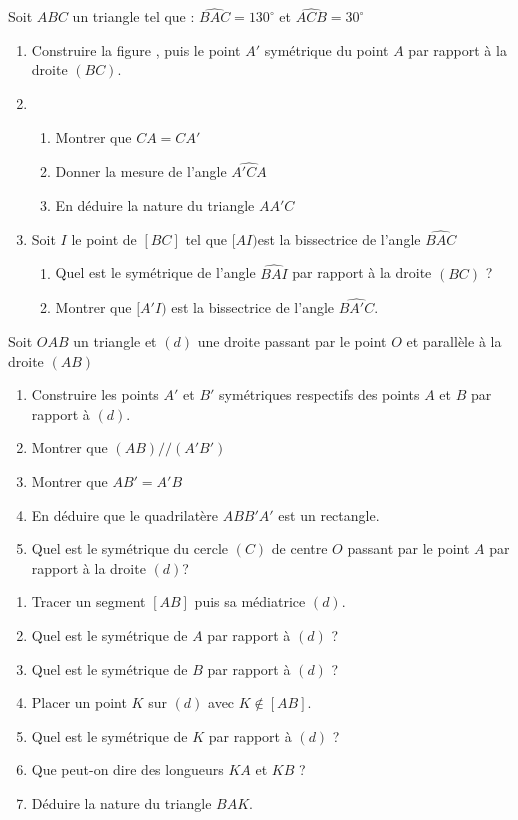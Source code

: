 \documentclass[a4paper,12pt]{article}
\begin{document}
\begin{exo}
Soit $ABC$ un triangle tel que : $\widehat{BAC}=130^{\circ}$ et $\widehat{ACB}=30^{\circ}$
\begin{enumerate}
\item Construire la figure , puis le point $A'$ symétrique du point $A$ par rapport à la droite $(BC)$.
\item
	\begin{enumerate}
	\item Montrer que $CA=CA'$
	\item Donner la mesure de l'angle $\widehat{A'CA}$
	\item En déduire la nature du triangle $AA'C$
	\end{enumerate}
\item Soit $I$ le point de $[BC]$ tel que $[AI)$est  la bissectrice de l'angle $\widehat{BAC}$
		\begin{enumerate}
		\item Quel est le symétrique de l'angle $\widehat{BAI}$ par rapport à la droite $(BC)$ ?
		\item Montrer que $[A'I)$ est la bissectrice de l'angle $\widehat{BA'C}$.
		\end{enumerate}	
\end{enumerate}
\end{exo}

\begin{exo}
Soit $OAB$ un triangle et $(d)$ une droite passant par le point $O$ et parallèle à la droite $(AB)$
\begin{enumerate}
\item Construire les points $A'$ et $B'$ symétriques respectifs des points $A$ et $B$ par rapport à $(d)$.
\item Montrer que $(AB)//(A'B')$
\item Montrer que $AB'=A'B$
\item En déduire que le quadrilatère $ABB'A'$ est un rectangle.
\item Quel est le symétrique du cercle $(C)$ de centre $O$ passant par le point $A$ par rapport à la droite $(d)$?
\end{enumerate}
\end{exo}

\begin{exo}
\begin{enumerate}
\item Tracer un segment $[AB]$ puis sa médiatrice $(d)$.
\item Quel est le symétrique de $A$ par rapport à $(d)$ ?
\item Quel est le symétrique de $B$ par rapport à $(d)$ ?
\item Placer un point $K$ sur $(d)$ avec $K\notin [AB]$.
\item Quel est le symétrique de $K$ par rapport à $(d)$ ?
\item Que peut-on dire des longueurs $KA$ et $KB$ ?
\item Déduire la nature du triangle $BAK$.
\end{enumerate}
\end{exo}
\end{document}
